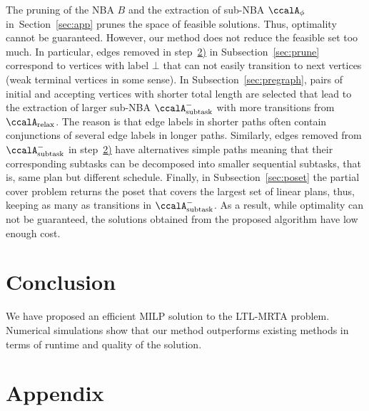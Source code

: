 \documentclass[Afour,sageh,times]{sagej}
\newcommand{\auto}[1]{\ccalA_{\textup{#1}}}
\newcommand{\autop}{\ccalA_{\phi}}
\begin{document}
{{The pruning of the NBA $B$ and the extraction of sub-NBA $\autop$ in~Section~\ref{sec:app} prunes the space of feasible solutions. Thus, optimality cannot be guaranteed. However, our method does not reduce the feasible set  too much. In particular, edges removed in step~\hyperref[prune:2]{2)} in Subsection~\ref{sec:prune} correspond to vertices with label $\bot$ that can not easily transition to next vertices {(weak terminal vertices in some sense)}. {In Subsection~\ref{sec:pregraph}, pairs of initial and accepting vertices with shorter total length are selected that lead to the  extraction of larger sub-NBA $\auto{subtask}^-$ {with more transitions} from $\auto{relax}$.} {The reason is that edge labels in shorter paths often contain conjunctions of several edge labels in longer paths}. Similarly, edges removed from $\auto{subtask}^-$ in step~\hyperref[sec:pregraph]{2)} {have alternatives simple paths} meaning that their corresponding subtasks can be decomposed into smaller sequential subtasks, {that is, same plan but different schedule}. Finally, in Subsection~\ref{sec:poset} the partial cover problem returns the poset that covers the largest set of linear plans, thus, keeping as many as transitions in $\auto{subtask}^-$. As a result, while optimality can not be guaranteed,  the solutions obtained from the proposed algorithm have low  enough cost. %
\section{Conclusion}
We have proposed an efficient MILP solution to the LTL-MRTA problem. Numerical simulations show that our method outperforms existing methods in terms of runtime and quality of the solution.

\section{Appendix}\label{sec:appendix}
}}
\end{document}
